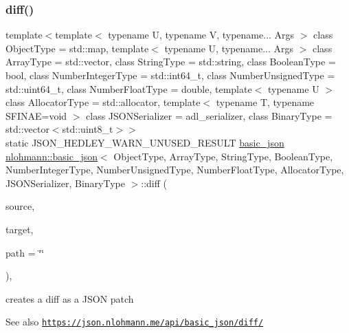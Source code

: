 \subsubsection{\texorpdfstring{diff()}{diff()}}
{\footnotesize\ttfamily template$<$template$<$ typename U, typename V, typename... Args $>$ class Object\+Type = std\+::map, template$<$ typename U, typename... Args $>$ class Array\+Type = std\+::vector, class String\+Type  = std\+::string, class Boolean\+Type  = bool, class Number\+Integer\+Type  = std\+::int64\+\_\+t, class Number\+Unsigned\+Type  = std\+::uint64\+\_\+t, class Number\+Float\+Type  = double, template$<$ typename U $>$ class Allocator\+Type = std\+::allocator, template$<$ typename T, typename S\+F\+I\+N\+A\+E=void $>$ class J\+S\+O\+N\+Serializer = adl\+\_\+serializer, class Binary\+Type  = std\+::vector$<$std\+::uint8\+\_\+t$>$$>$ \\
static J\+S\+O\+N\+\_\+\+H\+E\+D\+L\+E\+Y\+\_\+\+W\+A\+R\+N\+\_\+\+U\+N\+U\+S\+E\+D\+\_\+\+R\+E\+S\+U\+LT \hyperlink{classnlohmann_1_1basic__json}{basic\+\_\+json} \hyperlink{classnlohmann_1_1basic__json}{nlohmann\+::basic\+\_\+json}$<$ Object\+Type, Array\+Type, String\+Type, Boolean\+Type, Number\+Integer\+Type, Number\+Unsigned\+Type, Number\+Float\+Type, Allocator\+Type, J\+S\+O\+N\+Serializer, Binary\+Type $>$\+::diff (\begin{DoxyParamCaption}\item[{const \hyperlink{classnlohmann_1_1basic__json}{basic\+\_\+json}$<$ Object\+Type, Array\+Type, String\+Type, Boolean\+Type, Number\+Integer\+Type, Number\+Unsigned\+Type, Number\+Float\+Type, Allocator\+Type, J\+S\+O\+N\+Serializer, Binary\+Type $>$ \&}]{source,  }\item[{const \hyperlink{classnlohmann_1_1basic__json}{basic\+\_\+json}$<$ Object\+Type, Array\+Type, String\+Type, Boolean\+Type, Number\+Integer\+Type, Number\+Unsigned\+Type, Number\+Float\+Type, Allocator\+Type, J\+S\+O\+N\+Serializer, Binary\+Type $>$ \&}]{target,  }\item[{const std\+::string \&}]{path = {\ttfamily \char`\"{}\char`\"{}} }\end{DoxyParamCaption})\hspace{0.3cm}{\ttfamily [inline]}, {\ttfamily [static]}}



creates a diff as a J\+S\+ON patch 

\begin{DoxySeeAlso}{See also}
\href{https://json.nlohmann.me/api/basic_json/diff/}{\tt https\+://json.\+nlohmann.\+me/api/basic\+\_\+json/diff/} 
\end{DoxySeeAlso}
\mbox{\label{classnlohmann_1_1basic__json_a476756fb08e7f2416aad116d137977f4}} 

